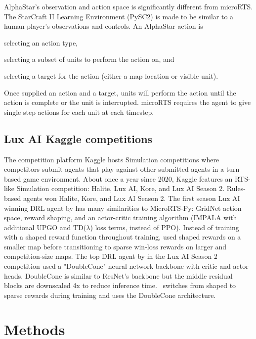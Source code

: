 \documentclass[conference]{IEEEtran}
\begin{document}
AlphaStar's observation and action space is significantly different from microRTS. The
StarCraft II Learning Environment (PySC2) is made to be similar to a human player's
observations and controls. An AlphaStar action is 
\begin{inparaenum}[(1)]
    \item selecting an action type,
    \item selecting a subset of units to perform the action on, and
    \item selecting a target for the action (either a map location or visible unit).
\end{inparaenum}
Once supplied an action and a target, units will perform the action until the action is complete or the unit is interrupted.
microRTS requires the agent to give single step actions for each unit at each timestep.

\subsection{Lux AI Kaggle competitions}
The competition platform Kaggle hosts Simulation competitions where competitors
submit agents that play against other submitted agents in a turn-based game
environment. About once a year since 2020, Kaggle features an RTS-like Simulation competition:
Halite, Lux AI, Kore, and Lux AI Season 2. Rules-based agents won Halite, Kore, and Lux
AI Season 2. The first season Lux AI winning DRL agent by \cite{lux-ai-2021-winner} 
has many similarities to MicroRTS-Py: GridNet action space, reward shaping, and an
actor-critic training algorithm (IMPALA with additional UPGO and TD($\lambda$) loss
terms, instead of PPO). Instead
of training with a shaped reward function throughout training, \cite{lux-ai-2021-winner}
used shaped rewards on a smaller map before transitioning to sparse win-loss rewards on
larger and competition-size maps. The top DRL agent by \cite{Ferdinand2021doublecone} in the Lux AI Season 2 competition used a "DoubleCone" neural
network backbone with critic and actor heads. DoubleCone is similar to ResNet's backbone but the 
middle residual blocks are downscaled 4x to reduce inference time.
\agentName\ switches from shaped to sparse rewards during training and uses the DoubleCone architecture.


\section{Methods}
\label{sec:methods}
\end{document}

